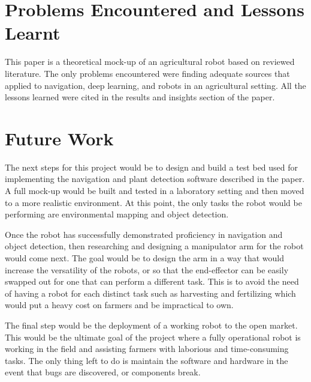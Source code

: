 \documentclass[12pt]{article}
\begin{document}
\section{Problems Encountered and Lessons Learnt}
This paper is a theoretical mock-up of an agricultural robot based on reviewed literature. The only problems encountered were finding adequate sources that applied to navigation, deep learning, and robots in an agricultural setting. All the lessons learned were cited in the results and insights section of the paper.

\section{Future Work}

The next steps for this project would be to design and build a test bed used for implementing the navigation and plant detection software described in the paper. A full mock-up would be built and tested in a laboratory setting and then moved to a more realistic environment. At this point, the only tasks the robot would be performing are environmental mapping and object detection.

Once the robot has successfully demonstrated proficiency in navigation and object detection, then researching and designing a manipulator arm for the robot would come next. The goal would be to design the arm in a way that would increase the versatility of the robots, or so that the end-effector can be easily swapped out for one that can perform a different task. This is to avoid the need of having a robot for each distinct task such as harvesting and fertilizing which would put a heavy cost on farmers and be impractical to own.

The final step would be the deployment of a working robot to the open market. This would be the ultimate goal of the project where a fully operational robot is working in the field and assisting farmers with laborious and time-consuming tasks. The only thing left to do is maintain the software and hardware in the event that bugs are discovered, or components break.

\end{document}
